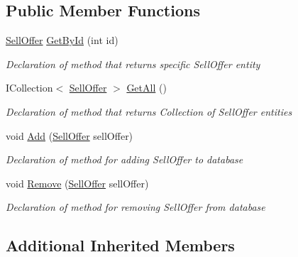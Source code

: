 \subsection*{Public Member Functions}
\begin{DoxyCompactItemize}
\item 
\mbox{\hyperlink{class_gielda_l2_1_1_d_b_1_1_entities_1_1_sell_offer}{Sell\+Offer}} \mbox{\hyperlink{interface_gielda_l2_1_1_d_b_1_1_interfaces_1_1_i_sell_offer_repository_aded9f3b24232b67af3c898689fe5d3ac}{Get\+By\+Id}} (int id)
\begin{DoxyCompactList}\small\item\em Declaration of method that returns specific Sell\+Offer entity \end{DoxyCompactList}\item 
I\+Collection$<$ \mbox{\hyperlink{class_gielda_l2_1_1_d_b_1_1_entities_1_1_sell_offer}{Sell\+Offer}} $>$ \mbox{\hyperlink{interface_gielda_l2_1_1_d_b_1_1_interfaces_1_1_i_sell_offer_repository_a9d5a9662923804caeedb86878a8635f7}{Get\+All}} ()
\begin{DoxyCompactList}\small\item\em Declaration of method that returns Collection of Sell\+Offer entities \end{DoxyCompactList}\item 
void \mbox{\hyperlink{interface_gielda_l2_1_1_d_b_1_1_interfaces_1_1_i_sell_offer_repository_a18f7f7c3a677e89bdc055a6b4a6a248a}{Add}} (\mbox{\hyperlink{class_gielda_l2_1_1_d_b_1_1_entities_1_1_sell_offer}{Sell\+Offer}} sell\+Offer)
\begin{DoxyCompactList}\small\item\em Declaration of method for adding Sell\+Offer to database \end{DoxyCompactList}\item 
void \mbox{\hyperlink{interface_gielda_l2_1_1_d_b_1_1_interfaces_1_1_i_sell_offer_repository_ab77d59db7295ed7a3c7457f8cc0d84d2}{Remove}} (\mbox{\hyperlink{class_gielda_l2_1_1_d_b_1_1_entities_1_1_sell_offer}{Sell\+Offer}} sell\+Offer)
\begin{DoxyCompactList}\small\item\em Declaration of method for removing Sell\+Offer from database \end{DoxyCompactList}\end{DoxyCompactItemize}
\subsection*{Additional Inherited Members}


